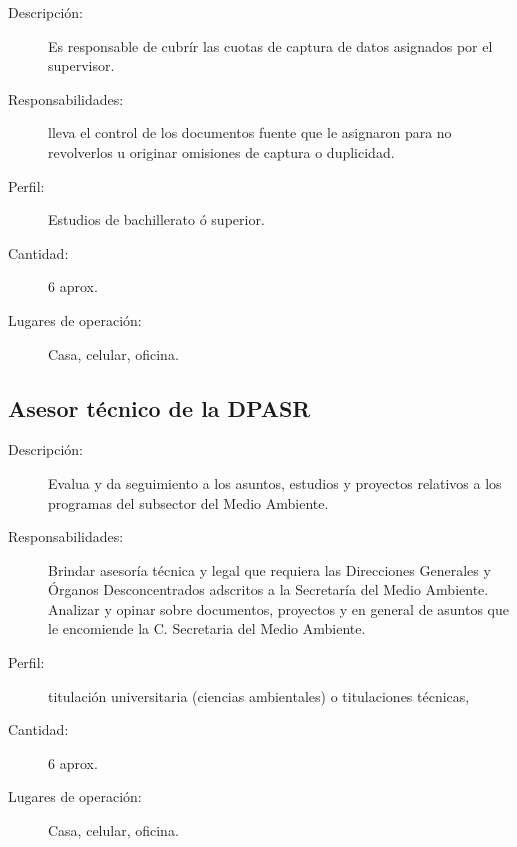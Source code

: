 \begin{description}
	\item[Descripción: ] Es responsable de cubrír las cuotas de captura de datos asignados por el supervisor.
	\item[Responsabilidades: ]lleva el control de los documentos fuente que le asignaron para no revolverlos u originar omisiones de captura o duplicidad.
	\item[Perfil: ]  Estudios de bachillerato ó superior.
 
	\item[Cantidad: ] 6 aprox. 
	\item[Lugares de operación: ] Casa, celular, oficina.
\end{description}

\subsection{Asesor técnico de la DPASR}

\begin{description}
	\item[Descripción: ] Evalua y da seguimiento a los asuntos, estudios y proyectos relativos a los programas del subsector del Medio Ambiente.
	\item[Responsabilidades: ]Brindar asesoría técnica y legal que requiera  las Direcciones Generales y Órganos Desconcentrados adscritos a la Secretaría del Medio Ambiente. Analizar y opinar sobre documentos, proyectos y en general de asuntos que le encomiende la C. Secretaria del Medio Ambiente. 
	\item[Perfil: ] titulación universitaria (ciencias ambientales) o titulaciones técnicas,
	\item[Cantidad: ] 6 aprox. 
	\item[Lugares de operación: ] Casa, celular, oficina.
\end{description}